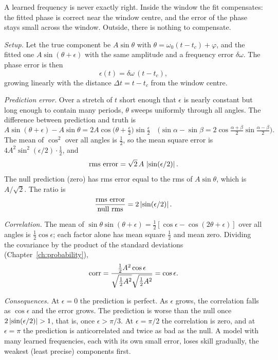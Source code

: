 A learned frequency is never exactly right. Inside the window the fit compensates: the fitted phase is correct near the window centre, and the error of the phase stays small across the window. Outside, there is nothing to compensate.

\emph{Setup.} Let the true component be $A\sin\theta$ with $\theta=\omega_0(t-t_c)+\varphi$, and the fitted one $A\sin(\theta+\epsilon)$ with the same amplitude and a frequency error $\delta\omega$. The phase error is then
\begin{equation}
\epsilon(t)=\delta\omega\,(t-t_c),
\label{eq:sparse-frequency-dephase}
\end{equation}
growing linearly with the distance $\Delta t=t-t_c$ from the window centre.

\emph{Prediction error.} Over a stretch of $t$ short enough that $\epsilon$ is nearly constant but long enough to contain many periods, $\theta$ sweeps uniformly through all angles. The difference between prediction and truth is
\begin{equation}
A\sin(\theta+\epsilon)-A\sin\theta=2A\cos\bigl(\theta+\tfrac\epsilon2\bigr)\sin\tfrac\epsilon2\quad\text{($\sin\alpha-\sin\beta=2\cos\tfrac{\alpha+\beta}2\sin\tfrac{\alpha-\beta}2$)}.
\end{equation}
The mean of $\cos^2$ over all angles is $\tfrac12$, so the mean square error is $4A^2\sin^2(\epsilon/2)\cdot\tfrac12$, and
\begin{equation}
\text{rms error}=\sqrt2\,A\,\left\lvert \sin(\epsilon/2)\right\rvert .
\end{equation}
The null prediction (zero) has rms error equal to the rms of $A\sin\theta$, which is $A/\sqrt2$. The ratio is
\begin{equation}
\frac{\text{rms error}}{\text{null rms}}=2\left\lvert \sin(\epsilon/2)\right\rvert .
\label{eq:sparse-frequency-rmsratio}
\end{equation}

\emph{Correlation.} The mean of $\sin\theta\sin(\theta+\epsilon)=\tfrac12[\cos\epsilon-\cos(2\theta+\epsilon)]$ over all angles is $\tfrac12\cos\epsilon$; each factor alone has mean square $\tfrac12$ and mean zero. Dividing the covariance by the product of the standard deviations (Chapter~\ref{ch:probability}),
\begin{equation}
\mathrm{corr}=\frac{\tfrac12A^2\cos\epsilon}{\sqrt{\tfrac12A^2}\sqrt{\tfrac12A^2}}=\cos\epsilon .
\label{eq:sparse-frequency-corr}
\end{equation}

\emph{Consequences.} At $\epsilon=0$ the prediction is perfect. As $\epsilon$ grows, the correlation falls as $\cos\epsilon$ and the error grows. The prediction is worse than the null once $2\left\lvert \sin(\epsilon/2)\right\rvert>1$, that is, once $\epsilon>\pi/3$. At $\epsilon=\pi/2$ the correlation is zero, and at $\epsilon=\pi$ the prediction is anticorrelated and twice as bad as the null. A model with many learned frequencies, each with its own small error, loses skill gradually, the weakest (least precise) components first.

